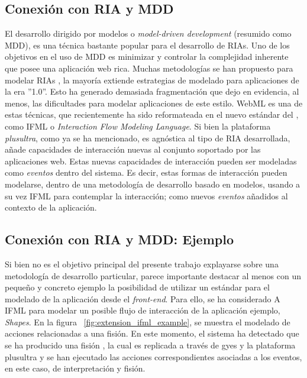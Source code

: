 \subsection{Conexión con RIA y MDD} \label{sec:extension_ria_mdd_conexion}
El desarrollo dirigido por modelos o \emph{model-driven development} (resumido como MDD), es una técnica bastante popular para el desarrollo de RIAs. Uno de los objetivos en el uso de MDD es minimizar y controlar la complejidad inherente que posee una aplicación web rica. 
Muchas metodologías se han propuesto para modelar RIAs \citep{wright2008requirements} \citep{preciado2005necessity}, la mayoría extiende estrategias de modelado para aplicaciones de la era ''1.0''. Esto ha generado demasiada fragmentación que dejo en evidencia, al menos, las dificultades para modelar aplicaciones de este estilo. WebML\citep{omg:webml} es una de estas técnicas, que recientemente ha sido reformateada en el nuevo estándar del \citet{omg:omg}, como IFML \citep{omg:ifml} o \emph{Interaction Flow Modeling Language}. 
Si bien la plataforma \emph{plusultra}, como ya se ha mencionado, es agnóstica al tipo de RIA desarrollada, añade capacidades de interacción nuevas al conjunto soportado por las aplicaciones web. Estas nuevas capacidades de interacción pueden ser modeladas como \emph{eventos} dentro del sistema. 
Es decir, estas formas de interacción pueden modelarse, dentro de una metodología de desarrollo basado en modelos, usando a su vez IFML para contemplar la interacción; como nuevos \emph{eventos} añadidos al contexto de la aplicación.


\subsection{Conexión con RIA y MDD: Ejemplo}
Si bien no es el objetivo principal del presente trabajo explayarse sobre una metodología de desarrollo particular, parece importante destacar al menos con un pequeño y concreto ejemplo la posibilidad de utilizar un estándar para el modelado de la aplicación desde el \emph{front-end}. Para ello, se ha considerado A IFML para modelar un posible flujo de interacción de la aplicación ejemplo, \emph{Shapes}. En la figura ~\ref{fig:extension_ifml_example}, se muestra el modelado de acciones relacionadas a una fisión. En este momento, el sistema ha detectado que se ha producido una fisión , la cual es replicada a través de gyes y la plataforma plusultra y se han ejecutado las acciones correspondientes asociadas a los eventos, en este caso, de interpretación y fisión.

